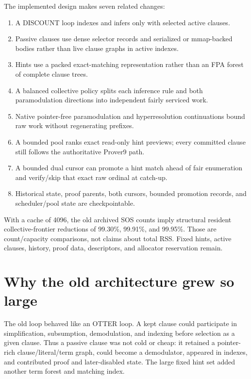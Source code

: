 \documentclass[11pt]{article}
\begin{document}
The implemented design makes seven related changes:

\begin{enumerate}
  \item A DISCOUNT loop indexes and infers only with selected active clauses.
  \item Passive clauses use dense selector records and serialized or
        mmap-backed bodies rather than live clause graphs in active indexes.
  \item Hints use a packed exact-matching representation rather than an FPA
        forest of complete clause trees.
  \item A balanced collective policy splits each inference rule and both
        paramodulation directions into independent fairly serviced work.
  \item Native pointer-free paramodulation and hyperresolution continuations
        bound raw work without regenerating prefixes.
  \item A bounded pool ranks exact read-only hint previews; every committed
        clause still follows the authoritative Prover9 path.
  \item A bounded dual cursor can promote a hint match ahead of fair
        enumeration and verify/skip that exact raw ordinal at catch-up.
  \item Historical state, proof parents, both cursors, bounded promotion
        records, and scheduler/pool state are checkpointable.
\end{enumerate}

With a cache of 4096, the old archived SOS counts imply structural resident
collective-frontier reductions of 99.30\%, 99.91\%, and 99.95\%.  Those are
count/capacity comparisons, not claims about total RSS.  Fixed hints, active
clauses, history, proof data, descriptors, and allocator reservation remain.

\section{Why the old architecture grew so large}

The old loop behaved like an OTTER loop.  A kept clause could participate in
simplification, subsumption, demodulation, and indexing before selection as a
given clause.  Thus a passive clause was not cold or cheap: it retained a
pointer-rich clause/literal/term graph, could become a demodulator, appeared in
indexes, and contributed proof and later-disabled state.  The large fixed hint
set added another term forest and matching index.
\end{document}
